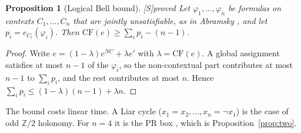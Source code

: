 \documentclass[11pt]{article}
\newtheorem{proposition}[theorem]{Proposition}
\theoremstyle{definition}
\theoremstyle{remark}
\newcommand{\Z}{\mathbb{Z}}
\newcommand{\CF}{\mathrm{CF}}
\newcommand{\src}[1]{\textsf{\small[#1]}}
\newcommand{\st}[1]{\textsf{\small\color{gray}#1}}
\begin{document}
\begin{proposition}[Logical Bell bound]\label{prop:lbell}\src{S}\st{proved}
Let $\varphi_1,\dots,\varphi_n$ be formulas on contexts $C_1,\dots,C_n$ that are jointly unsatisfiable, as in Abramsky \cite{abramsky20}, and let $p_i=e_{C_i}(\varphi_i)$. Then $\CF(e)\ge\sum_ip_i-(n-1)$.
\end{proposition}
\begin{proof}
Write $e=(1-\lambda)e^{NC}+\lambda e'$ with $\lambda=\CF(e)$. A global assignment satisfies at most $n-1$ of the $\varphi_i$, so the non-contextual part contributes at most $n-1$ to $\sum_i p_i$, and the rest contributes at most $n$. Hence $\sum_ip_i\le(1-\lambda)(n-1)+\lambda n$.
\end{proof}
\noindent The bound costs linear time. A Liar cycle ($x_1=x_2,\dots,x_n=\neg x_1$) is the case of odd $\Z/2$ holonomy. For $n=4$ it is the PR box \cite{abramsky20}, which is Proposition~\ref{prop:two}.
\end{document}
